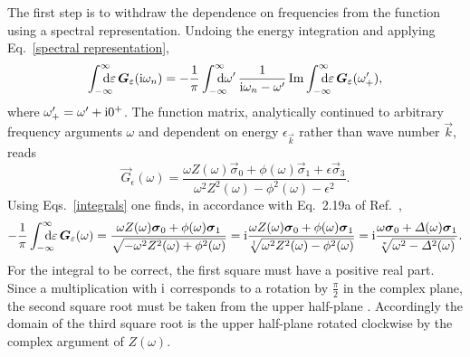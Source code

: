 The first step is to withdraw the dependence on  frequencies
from the  function using a spectral representation. Undoing the
energy integration and applying Eq.~\ref{spectral representation},
%
\begin{equation*}
    \int \from{-\infty} \till \infty \D \epsilon \, \vec G_\epsilon(\I \omega_n)
    = -\frac 1 \pi
    \int \from{-\infty} \till \infty \D \omega' \,
    \frac 1 {\I \omega_n - \omega'}
    \Im \int \from{-\infty} \till \infty \D \epsilon \,
    \vec G_\epsilon(\omega'_+),
\end{equation*}
%
where $\omega'_+ = \omega' + \mathrm i 0^+$. The  function matrix,
analytically continued to arbitrary frequency arguments $\omega$ and dependent
on energy $\epsilon_{\vec k}$ rather than wave number $\vec k$, reads
%
\begin{equation*}
    \vec G_\epsilon(\omega) = \frac
        { \omega Z(\omega) \vec \sigma_0
        + \phi(\omega) \vec \sigma_1
        + \epsilon \vec \sigma_3 }
        { \omega^2 Z^2(\omega)
        - \phi^2(\omega)
        - \epsilon^2}.
\end{equation*}
%
Using Eqs.~\ref{integrals} one finds, in accordance with Eq.~2.19a of
Ref.~,
%
\begin{equation*}
    -\frac 1 \pi \int \from{-\infty} \till \infty \D \epsilon \,
    \vec G_\epsilon(\omega)
    = \frac
        {\omega Z(\omega) \vec \sigma_0 + \phi(\omega) \vec \sigma_1}
        {\sqrt{-\omega^2 Z^2(\omega) + \phi^2(\omega)}}
    = \I \frac
        {\omega Z(\omega) \vec \sigma_0 + \phi(\omega) \vec \sigma_1}
        {\sqrt[\dagger]{\omega^2 Z^2(\omega) - \phi^2(\omega)}}
    = \I \frac
        {\omega \vec \sigma_0 + \Delta(\omega) \vec \sigma_1}
        {\sqrt[*]{\omega^2 - \Delta^2(\omega)}}.
\end{equation*}
%
For the integral to be correct, the first square must have a positive real part.
Since a multiplication with $\mathrm i$ corresponds to a rotation by $\frac \pi 2$ in
the complex plane, the second square root must be taken from the upper
half-plane \cite[Eq.~2.19b]{ScalapinoSchriefferWilkins66}. Accordingly the
domain of the third square root is the upper half-plane rotated clockwise by the
complex argument of $Z(\omega)$.

